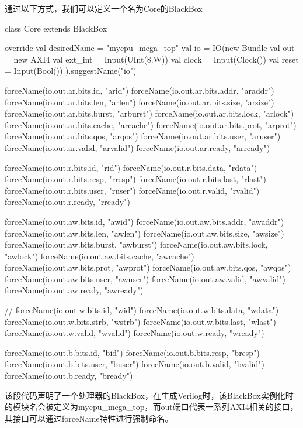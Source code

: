 通过以下方式，我们可以定义一个名为Core的BlackBox

\begin{CodeBlock}[language=BookScala]
class Core extends BlackBox {
  override val desiredName = "mycpu_mega_top"
  val io = IO(new Bundle {
    val out = new AXI4
    val ext_int = Input(UInt(8.W))
    val clock = Input(Clock())
    val reset = Input(Bool())
  }).suggestName("io")

  forceName(io.out.ar.bits.id, "arid")
  forceName(io.out.ar.bits.addr, "araddr")
  forceName(io.out.ar.bits.len, "arlen")
  forceName(io.out.ar.bits.size, "arsize")
  forceName(io.out.ar.bits.burst, "arburst")
  forceName(io.out.ar.bits.lock, "arlock")
  forceName(io.out.ar.bits.cache, "arcache")
  forceName(io.out.ar.bits.prot, "arprot")
  forceName(io.out.ar.bits.qos, "arqos")
  forceName(io.out.ar.bits.user, "aruser")
  forceName(io.out.ar.valid, "arvalid")
  forceName(io.out.ar.ready, "arready")

  forceName(io.out.r.bits.id, "rid")
  forceName(io.out.r.bits.data, "rdata")
  forceName(io.out.r.bits.resp, "rresp")
  forceName(io.out.r.bits.last, "rlast")
  forceName(io.out.r.bits.user, "ruser")
  forceName(io.out.r.valid, "rvalid")
  forceName(io.out.r.ready, "rready")

  forceName(io.out.aw.bits.id, "awid")
  forceName(io.out.aw.bits.addr, "awaddr")
  forceName(io.out.aw.bits.len, "awlen")
  forceName(io.out.aw.bits.size, "awsize")
  forceName(io.out.aw.bits.burst, "awburst")
  forceName(io.out.aw.bits.lock, "awlock")
  forceName(io.out.aw.bits.cache, "awcache")
  forceName(io.out.aw.bits.prot, "awprot")
  forceName(io.out.aw.bits.qos, "awqos")
  forceName(io.out.aw.bits.user, "awuser")
  forceName(io.out.aw.valid, "awvalid")
  forceName(io.out.aw.ready, "awready")

  // forceName(io.out.w.bits.id, "wid")
  forceName(io.out.w.bits.data, "wdata")
  forceName(io.out.w.bits.strb, "wstrb")
  forceName(io.out.w.bits.last, "wlast")
  forceName(io.out.w.valid, "wvalid")
  forceName(io.out.w.ready, "wready")

  forceName(io.out.b.bits.id, "bid")
  forceName(io.out.b.bits.resp, "bresp")
  forceName(io.out.b.bits.user, "buser")
  forceName(io.out.b.valid, "bvalid")
  forceName(io.out.b.ready, "bready")
}
\end{CodeBlock}

该段代码声明了一个处理器的BlackBox，在生成Verilog时，该BlackBox实例化时的模块名会被定义为mycpu\_mega\_top，而out端口代表一系列AXI4相关的接口，其接口可以通过forceName特性进行强制命名。

